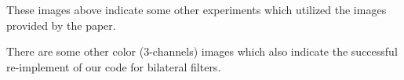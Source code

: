 \documentclass[12pt]{article}
\begin{document}
These images above indicate some other experiments which utilized the images provided by the paper.

There are some other color (3-channels) images which also indicate the successful re-implement of our code for bilateral filters.

\begin{figure}[H]
  \centering

  \quad
  \quad
  \quad
\end{figure}
\end{document}
